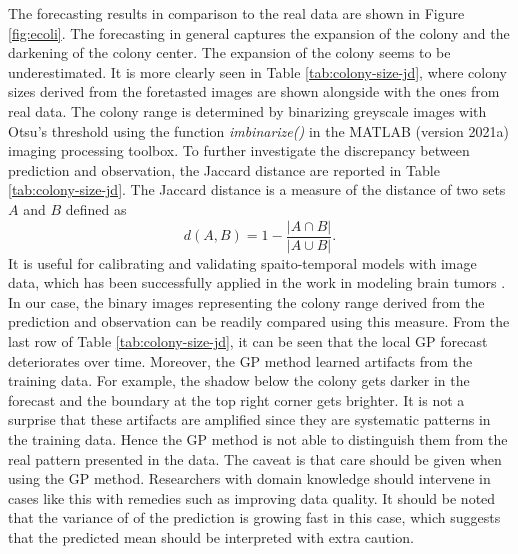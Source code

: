 \documentclass[smallextended,natbib]{svjour3}       %
\begin{document}
The forecasting results in comparison to the real data are shown in Figure \ref{fig:ecoli}. The forecasting in general captures the expansion of the colony and the darkening of the colony center. The expansion of the colony seems to be underestimated. It is more clearly seen in Table \ref{tab:colony-size-jd}, where colony sizes derived from the foretasted images are shown alongside with the ones from real data. The colony range is determined by binarizing greyscale images with Otsu's threshold \citep{otsu1979threshold} using the function \textit{imbinarize()} in the MATLAB (version 2021a) imaging processing toolbox. To further investigate the discrepancy between prediction and observation, the Jaccard distance are reported in Table \ref{tab:colony-size-jd}. The Jaccard distance is a measure of the distance of two sets $A$ and $B$ defined as \[d(A,B)=1-\frac{\vert A \cap B \vert}{\vert A \cup B \vert}.\] It is useful for calibrating and validating spaito-temporal models with image data, which has been successfully applied in the work in modeling brain tumors \citep{rutter2017mathematical}. In our case, the binary images representing the colony range derived from the prediction and observation can be readily compared using this measure. From the last row of Table \ref{tab:colony-size-jd}, it can be seen that the local GP forecast deteriorates over time. Moreover, the GP method learned artifacts from the training data. For example, the shadow below the colony gets darker in the forecast and the boundary at the top right corner gets brighter. It is not a surprise that these artifacts are amplified since they are systematic patterns in the training data. Hence the GP method is not able to distinguish them from the real pattern presented in the data. The caveat is that care should be given when using the GP method. Researchers with domain knowledge should intervene in cases like this with remedies such as improving data quality. It should be noted that the variance of of the prediction is growing fast in this case, which suggests that the predicted mean should be interpreted with extra caution.          
\end{document}
